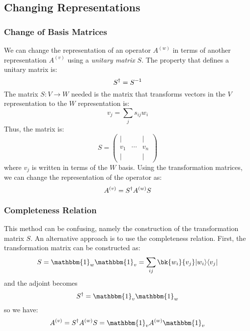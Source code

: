 \subsection{Changing Representations}
\subsubsection{Change of Basis Matrices}
We can change the representation of an operator \(A^{(w)}\) in terms of another representation \(A^{(v)}\) using a \emph{unitary matrix} \(S\). The property that defines a unitary matrix is:
\begin{equation}
	S^{\dagger}=S^{-1}\label{eq2:unitary}
\end{equation}
The matrix \(S:V\to W\) needed is the matrix that transforms vectors in the \(V\) representation to the \(W\) representation is:
\begin{equation}
	v_j = \sum_j s_{ij}w_i \label{eq2:cob}
\end{equation}
Thus, the matrix is:
\begin{equation}
	S=\begin{pmatrix} | & & | \\ v_1 & \cdots & v_n \\ | && | \end{pmatrix}\label{eq2:cobm}
\end{equation}
where \(v_j\) is written in terms of the \(W\) basis. Using the transformation matrices, we can change the representation of the operator as:
\begin{equation}
	A^{(v)} = S^{\dagger} A^{(w)} S \label{eq2:chrep}
\end{equation}

\subsubsection{Completeness Relation}
This method can be confusing, namely the construction of the transformation matrix \(S\). An alternative approach is to use the completeness relation. First, the transformation matrix can be constructed as:
\begin{equation}
	S = \mathbbm{1}_w \mathbbm{1}_v = \sum_{ij}\bk{w_i}{v_j}\k{w_i}\b{v_j}
\end{equation}
and the  adjoint becomes
\[ S\adj = \mathbbm{1}_v\mathbbm{1}_w\]
so we have:
\begin{equation}
	A^{(v)} =S \adj A^{(w)} S = \mathbbm{1}_v A^{(w)} \mathbbm{1}_v \label{eq2:cob1}
\end{equation}

